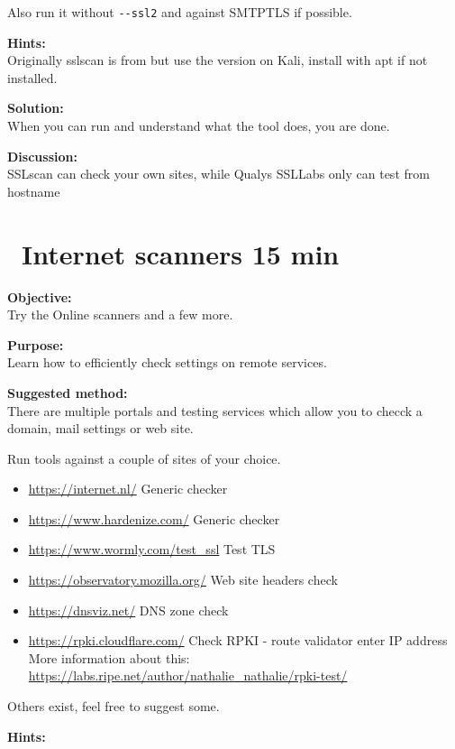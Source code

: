 \documentclass[a4paper,11pt,notitlepage]{report}
\begin{document}
Also run it without \verb+--ssl2+ and against SMTPTLS if possible.

{\bf Hints:}\\
Originally sslscan is from  but use the version on Kali, install with apt if not installed.

{\bf Solution:}\\
When you can run and understand what the tool does, you are done.

{\bf Discussion:}\\
SSLscan can check your own sites, while Qualys SSLLabs only can test from hostname


\chapter{\faExclamationTriangle\ Internet scanners 15 min}
\label{ex:web-site-check}

{\bf Objective:}\\
Try the Online scanners  and a few more.

{\bf Purpose:}\\
Learn how to efficiently check settings on remote services.

{\bf Suggested method:}\\
There are multiple portals and testing services which allow you to checck a domain,
mail settings or web site.

Run tools against a couple of sites of your choice.
\begin{itemize}
\item \url{https://internet.nl/} Generic checker
\item \url{https://www.hardenize.com/} Generic checker
\item \url{https://www.wormly.com/test_ssl} Test TLS
\item \url{https://observatory.mozilla.org/} Web site headers check
\item \url{https://dnsviz.net/} DNS zone check
\item \url{https://rpki.cloudflare.com/} Check RPKI - route validator enter
IP address\\
More information about this: \url{https://labs.ripe.net/author/nathalie_nathalie/rpki-test/}
\end{itemize}

Others exist, feel free to suggest some.

{\bf Hints:}\\
\end{document}
